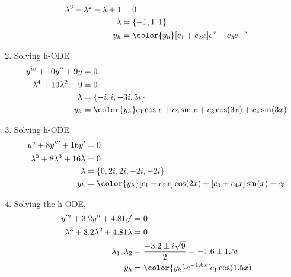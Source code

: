 \begin{enumerate}
\begin{align}
              \lambda^{3} - \lambda^{2} - \lambda + 1 & = 0                                    \\
              \lambda                                 & = \{-1, 1, 1\}                         \\
              y_{h}                                   & = {\color{y_h} [c_{1} + c_{2}x]e^{x} +
              c_{3}e^{-x}}
          \end{align}
    \item Solving h-ODE
          \begin{align}
              y^{iv} + 10y'' + 9y             & = 0                                         \\
              \lambda^{4} + 10\lambda^{2} + 9 & = 0                                         \\
              \lambda                         & = \{-i, i, -3i, 3i\}                        \\
              y_{h}                           & = {\color{y_h} c_{1}\cos x + c_{2} \sin x +
              c_{3}\cos(3x) + c_{4}\sin(3x) }
          \end{align}
    \item Solving h-ODE
          \begin{align}
              y^{v} + 8y''' + 16y'                   & = 0                                       \\
              \lambda^{5} + 8\lambda^{3} + 16\lambda & = 0                                       \\
              \lambda                                & = \{0, 2i, 2i, -2i, -2i\}                 \\
              y_{h}                                  & = {\color{y_h} [c_{1} + c_{2}x]\cos(2x) +
              [c_{3} + c_{4}x]\sin(x) + c_{5} }
          \end{align}
    \item Solving the h-ODE,
          \begin{align}
              y''' + 3.2y'' + 4.81y'                     & = 0                                            \\
              \lambda^{3} + 3.2\lambda^{2} + 4.81\lambda & = 0                                            \\
              \lambda_{1}, \lambda_{2}                   & = \frac{-3.2 \pm i\sqrt{9}}{2} = -1.6 \pm 1.5i \\
              y_{h}                                      & = \color{y_h} e^{-1.6x}[c_{1}\cos(1.5x)

\end{align}
\end{enumerate}
